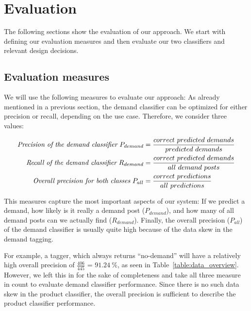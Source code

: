 
\section{Evaluation}
\label{sec:evaluation}


The following sections show the evaluation of our approach.
We start with defining our evaluation measures and then evaluate our two classifiers and relevant design decisions.

\subsection{Evaluation measures}
\label{sub:evaluation_measures}
We will use the following measures to evaluate our approach:
As already mentioned in a previous section, the demand classifier can be optimized for either precision or recall, depending on the use case.
Therefore, we consider three values:

\begin{align*}
	\emph{Precision of the demand classifier}~P_{demand} 			&= \frac{correct~predicted~demands}{predicted~demands} \\
	\emph{Recall of the demand classifier}~R_{demand} 				&= \frac{correct~predicted~demands}{all~demand~posts} \\
	\emph{Overall precision for both classes}~P_{all} &= \frac{correct~predictions}{all~predictions} \\
\end{align*}

This measures capture the most important aspects of our system: If we predict a demand, how likely is it really a demand post ($P_{demand}$), and how many of all demand posts can we actually find ($R_{demand}$).
Finally, the overall precision ($P_{all}$) of the demand classifier is usually quite high because of the data skew in the demand tagging.

For example, a tagger, which always returns ``no-demand'' will have a relatively high overall precision of $\frac{406}{445}$ = $91.24~\%$, as seen in Table~\ref{table:data_overview}.
However, we left this in for the sake of completeness and take all three measure in count to evaluate demand classifier performance.
Since there is no such data skew in the product classifier, the overall precision is sufficient to describe the product classifier performance.

